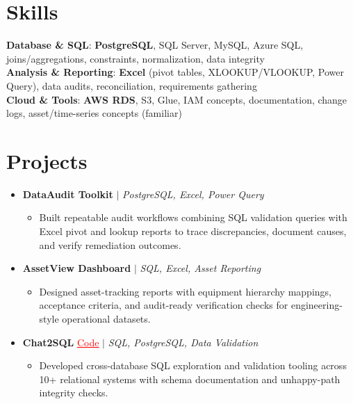 \documentclass[letterpaper,10pt]{article}
\newcommand{\resumeItem}[1]{\item\small{{#1 \vspace{-2pt}}}}
\newcommand{\resumeProjectHeading}[1]{\item \small #1 \vspace{-2pt}}
\newcommand{\resumeSubHeadingListStart}{\begin{itemize}[leftmargin=0.0in, label={}]}
\newcommand{\resumeSubHeadingListEnd}{\end{itemize}}
\newcommand{\resumeProjItemListStart}{\begin{itemize}[leftmargin=0.15in,label=\textbullet,itemsep=0pt,topsep=0pt,parsep=0pt,partopsep=0pt]}
\newcommand{\resumeProjItemListEnd}{\end{itemize}\vspace{-4pt}}
\begin{document}
\section{Skills}
\begin{itemize}[leftmargin=0.15in, label={}]
\small{\item{
\textbf{Database \& SQL}: \textbf{PostgreSQL}, SQL Server, MySQL, Azure SQL, joins/aggregations, constraints, normalization, data integrity \\
\textbf{Analysis \& Reporting}: \textbf{Excel} (pivot tables, XLOOKUP/VLOOKUP, Power Query), data audits, reconciliation, requirements gathering \\
\textbf{Cloud \& Tools}: \textbf{AWS RDS}, S3, Glue, IAM concepts, documentation, change logs, asset/time-series concepts (familiar)
}}
\end{itemize}
\vspace{-16pt}
\section{Projects}
\resumeSubHeadingListStart
\vspace{-2pt}
\resumeProjectHeading{\textbf{DataAudit Toolkit} $|$ \emph{PostgreSQL, Excel, Power Query}}
\resumeProjItemListStart
\resumeItem{Built repeatable audit workflows combining SQL validation queries with Excel pivot and lookup reports to trace discrepancies, document causes, and verify remediation outcomes.}
\resumeProjItemListEnd
\vspace{3pt}
\resumeProjectHeading{\textbf{AssetView Dashboard} $|$ \emph{SQL, Excel, Asset Reporting}}
\resumeProjItemListStart
\resumeItem{Designed asset-tracking reports with equipment hierarchy mappings, acceptance criteria, and audit-ready verification checks for engineering-style operational datasets.}
\resumeProjItemListEnd
\vspace{3pt}
\resumeProjectHeading{\textbf{Chat2SQL} {\href{https://github.com/SAHAJ-BHADJA/Chat2SQL}{\textcolor{red}{\underline{Code}}}} $|$ \emph{SQL, PostgreSQL, Data Validation}}
\resumeProjItemListStart
\resumeItem{Developed cross-database SQL exploration and validation tooling across 10+ relational systems with schema documentation and unhappy-path integrity checks.}
\resumeProjItemListEnd
\resumeSubHeadingListEnd
\end{document}
